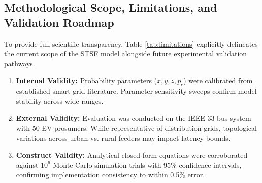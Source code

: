 \documentclass[10pt,twocolumn,journal]{IEEEtran}
\begin{document}
\subsection{Methodological Scope, Limitations, and Validation Roadmap}
To provide full scientific transparency, Table \ref{tab:limitations} explicitly delineates the current scope of the STSF model alongside future experimental validation pathways.

\begin{table}[htbp]
\caption{Methodological Scope, Limitations, and Future Validation Roadmap}
\label{tab:limitations}
\centering
\scriptsize
{}
\end{table}

\begin{enumerate}[leftmargin=*]
    \item \textbf{Internal Validity:} Probability parameters ($x, y, z, p_c$) were calibrated from established smart grid literature. Parameter sensitivity sweeps confirm model stability across wide ranges.
    \item \textbf{External Validity:} Evaluation was conducted on the IEEE 33-bus system with 50 EV prosumers. While representative of distribution grids, topological variations across urban vs. rural feeders may impact latency bounds.
    \item \textbf{Construct Validity:} Analytical closed-form equations were corroborated against $10^6$ Monte Carlo simulation trials with 95\% confidence intervals, confirming implementation consistency to within 0.5\% error.
\end{enumerate}
\end{document}
